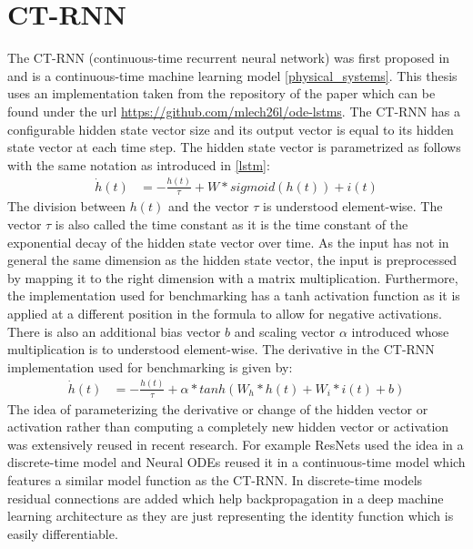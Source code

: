 \documentclass[draft,final]{vutinfth} %
\begin{document}
    \section{CT-RNN} \label{ctrnn}
    The CT-RNN (continuous-time recurrent neural network) was first proposed in \cite{CTRNN} and is a continuous-time machine learning model \ref{physical_systems}.
    This thesis uses an implementation taken from the repository of the paper \cite{ODELSTM} which can be found under the url \url{https://github.com/mlech26l/ode-lstms}.
    The CT-RNN has a configurable hidden state vector size and its output vector is equal to its hidden state vector at each time step.
    The hidden state vector is parametrized as follows \cite[p. 2]{CTRNN} with the same notation as introduced in \ref{lstm}:
    \begin{align}
    \label{paper_ct_rnn_function}
    \dot h(t) &= -\frac{h(t)}{\tau} + W * sigmoid(h(t)) + i(t)
    \end{align}
    The division between $h(t)$ and the vector $\tau$ is understood element-wise. The vector $\tau$ is also called the time constant as it is the time constant of the exponential decay of the hidden state vector over time.
    As the input has not in general the same dimension as the hidden state vector, the input is preprocessed by mapping it to the right dimension with a matrix multiplication.
    Furthermore, the implementation used for benchmarking has a tanh activation function as it is applied at a different position in the formula to allow for negative activations.
    There is also an additional bias vector $b$ and scaling vector $\alpha$ introduced whose multiplication is to understood element-wise.
    The derivative in the CT-RNN implementation used for benchmarking is given by:
    \begin{align}
    \label{used_ct_rnn_function}
    \dot h(t) &= -\frac{h(t)}{\tau} + \alpha * tanh(W_h * h(t) + W_i * i(t) + b)
    \end{align}
    The idea of parameterizing the derivative or change of the hidden vector or activation rather than computing a completely new hidden vector or activation was extensively reused in recent research.
    For example ResNets \cite{ResNet} used the idea in a discrete-time model and Neural ODEs \cite{NeuralODEs} reused it in a continuous-time model which features a similar model function as the CT-RNN.
    In discrete-time models residual connections are added which help backpropagation in a deep machine learning architecture as they are just representing the identity function which is easily differentiable.
\end{document}
